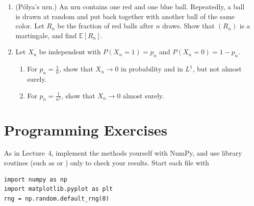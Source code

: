 \documentclass[11pt]{article}
\newcommand{\py}[1]{\texttt{\detokenize{#1}}}
\newcommand{\E}{\mathbb{E}}
\theoremstyle{definition}
\theoremstyle{plain}
\theoremstyle{remark}
\begin{document}
\begin{enumerate}[leftmargin=*]
    \begin{enumerate}[label=(\alph*)]
        \item Show that $\E[X_1\mathbf{1}_{\{M \leq t\}}] = \E\big[\frac{3}{4}M\mathbf{1}_{\{M \leq t\}}\big]$ for $0 \leq t \leq 1$. (One can show that this implies $\E[X_1 \mid M] = \frac{3}{4}M$, since the events $\{M \leq t\}$ generate $\sigma(M)$ and are closed under intersections.)
        \item Explain the result: given $M = m$, $X_1 = m$ with probability $\frac{1}{2}$, and otherwise $X_1$ is uniform on $[0, m]$. Check the tower property.
    \end{enumerate}
    \item (P\'olya's urn.) An urn contains one red and one blue ball. Repeatedly, a ball is drawn at random and put back together with another ball of the same color. Let $R_n$ be the fraction of red balls after $n$ draws. Show that $(R_n)$ is a martingale, and find $\E[R_n]$.
    \item Let $X_n$ be independent with $P(X_n = 1) = p_n$ and $P(X_n = 0) = 1 - p_n$.
    \begin{enumerate}[label=(\alph*)]
        \item For $p_n = \frac{1}{n}$, show that $X_n \to 0$ in probability and in $L^1$, but not almost surely.
        \item For $p_n = \frac{1}{n^2}$, show that $X_n \to 0$ almost surely.
    \end{enumerate}
\end{enumerate}

\section*{Programming Exercises}

\setlength{\emergencystretch}{3em}

As in Lecture~4, implement the methods yourself with NumPy, and use library routines (such as \py{rng.normal} or \py{scipy.stats}) only to check your results. Start each file with
\begin{lstlisting}
import numpy as np
import matplotlib.pyplot as plt
rng = np.random.default_rng(0)
\end{lstlisting}
\end{document}

